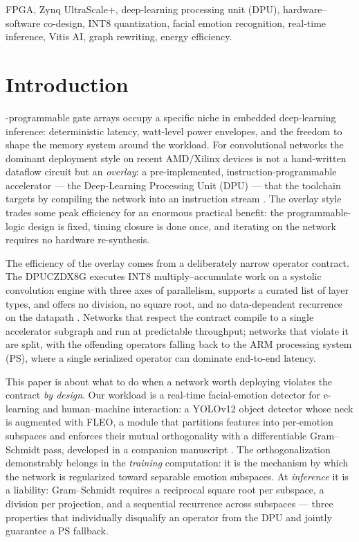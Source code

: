 \documentclass[onecolumn,journal]{IEEEtran}
\begin{document}
\begin{IEEEkeywords}
FPGA, Zynq UltraScale+, deep-learning processing unit (DPU), hardware--software
co-design, INT8 quantization, facial emotion recognition, real-time inference,
Vitis AI, graph rewriting, energy efficiency.
\end{IEEEkeywords}

\section{Introduction}\label{sec:intro}
-programmable gate arrays occupy a specific niche in embedded
deep-learning inference: deterministic latency, watt-level power envelopes, and the
freedom to shape the memory system around the workload. For convolutional networks the
dominant deployment style on recent AMD/Xilinx devices is not a hand-written dataflow
circuit but an \emph{overlay}: a pre-implemented, instruction-programmable accelerator
--- the Deep-Learning Processing Unit (DPU) --- that the toolchain targets by compiling
the network into an instruction stream \cite{amd_pg338,amd_ug1414}. The overlay style
trades some peak efficiency for an enormous practical benefit: the programmable-logic
design is fixed, timing closure is done once, and iterating on the network requires no
hardware re-synthesis.

The efficiency of the overlay comes from a deliberately narrow operator contract. The
DPUCZDX8G executes INT8 multiply--accumulate work on a systolic convolution engine with
three axes of parallelism, supports a curated list of layer types, and offers no
division, no square root, and no data-dependent recurrence on the datapath
\cite{amd_pg338}. Networks that respect the contract compile to a single accelerator
subgraph and run at predictable throughput; networks that violate it are split, with the
offending operators falling back to the ARM processing system (PS), where a single
serialized operator can dominate end-to-end latency.

This paper is about what to do when a network worth deploying violates the contract
\emph{by design}. Our workload is a real-time facial-emotion detector for e-learning and
human--machine interaction: a YOLOv12 object detector \cite{tian2025yolov12} whose neck
is augmented with FLEO, a module that partitions features into per-emotion subspaces and
enforces their mutual orthogonality with a differentiable Gram--Schmidt pass, developed
in a companion manuscript \cite{askri2026fleo}. The orthogonalization demonstrably
belongs in the \emph{training} computation: it is the mechanism by which the network is
regularized toward separable emotion subspaces. At \emph{inference} it is a liability:
Gram--Schmidt requires a reciprocal square root per subspace, a division per projection,
and a sequential recurrence across subspaces --- three properties that individually
disqualify an operator from the DPU and jointly guarantee a PS fallback.
\end{document}
